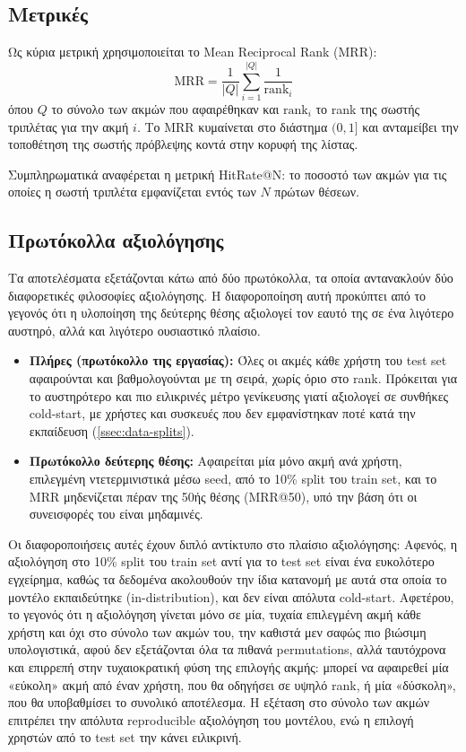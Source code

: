 \subsection{Μετρικές}
Ως κύρια μετρική χρησιμοποιείται το Mean Reciprocal Rank (MRR): $$\mathrm{MRR} = \frac{1}{|Q|} \sum_{i=1}^{|Q|} \frac{1}{\mathrm{rank}_i}$$ όπου $Q$ το σύνολο των ακμών που αφαιρέθηκαν και $\mathrm{rank}_i$ το rank της σωστής τριπλέτας για την ακμή $i$. Το MRR κυμαίνεται στο διάστημα $(0,1]$ και ανταμείβει την τοποθέτηση της σωστής πρόβλεψης κοντά στην κορυφή της λίστας.

Συμπληρωματικά αναφέρεται η μετρική HitRate@N: το ποσοστό των ακμών για τις οποίες η σωστή τριπλέτα εμφανίζεται εντός των $N$ πρώτων θέσεων.

\subsection{Πρωτόκολλα αξιολόγησης}
Τα αποτελέσματα εξετάζονται κάτω από δύο πρωτόκολλα, τα οποία αντανακλούν δύο διαφορετικές φιλοσοφίες αξιολόγησης. Η διαφοροποίηση αυτή προκύπτει από το γεγονός ότι η υλοποίηση της δεύτερης θέσης αξιολογεί τον εαυτό της σε ένα λιγότερο αυστηρό, αλλά και λιγότερο ουσιαστικό πλαίσιο.
\begin{itemize}
  \item \textbf{Πλήρες (πρωτόκολλο της εργασίας):} Όλες οι ακμές κάθε χρήστη του test set αφαιρούνται και βαθμολογούνται με τη σειρά, χωρίς όριο στο rank. Πρόκειται για το αυστηρότερο και πιο ειλικρινές μέτρο γενίκευσης γιατί αξιολογεί σε συνθήκες cold-start, με χρήστες και συσκευές που δεν εμφανίστηκαν ποτέ κατά την εκπαίδευση (\autoref{ssec:data-splits}).
  \item \textbf{Πρωτόκολλο δεύτερης θέσης:} Αφαιρείται μία μόνο ακμή ανά χρήστη, επιλεγμένη ντετερμινιστικά μέσω seed, από το 10\% split του train set, και το MRR μηδενίζεται πέραν της 50ής θέσης (MRR@50), υπό την βάση ότι οι συνεισφορές του είναι μηδαμινές.
\end{itemize}
Οι διαφοροποιήσεις αυτές έχουν διπλό αντίκτυπο στο πλαίσιο αξιολόγησης: Αφενός, η αξιολόγηση στο 10\% split του train set αντί για το test set είναι ένα ευκολότερο εγχείρημα, καθώς τα δεδομένα ακολουθούν την ίδια κατανομή με αυτά στα οποία το μοντέλο εκπαιδεύτηκε (in-distribution), και δεν είναι απόλυτα cold-start. Αφετέρου, το γεγονός ότι η αξιολόγηση γίνεται μόνο σε μία, τυχαία επιλεγμένη ακμή κάθε χρήστη και όχι στο σύνολο των ακμών του, την καθιστά μεν σαφώς πιο βιώσιμη υπολογιστικά, αφού δεν εξετάζονται όλα τα πιθανά permutations, αλλά ταυτόχρονα και επιρρεπή στην τυχαιοκρατική φύση της επιλογής ακμής: μπορεί να αφαιρεθεί μία «εύκολη» ακμή από έναν χρήστη, που θα οδηγήσει σε υψηλό rank, ή μία «δύσκολη», που θα υποβαθμίσει το συνολικό αποτέλεσμα. Η εξέταση στο σύνολο των ακμών επιτρέπει την απόλυτα reproducible αξιολόγηση του μοντέλου, ενώ η επιλογή χρηστών από το test set την κάνει ειλικρινή.

